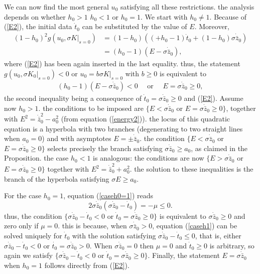 \begin{Proof}
We can now find the most general $u_0$ satisfying all these
restrictions. the analysis depends on whether $ h_0>1$ $ h_0 <1$ 
or $ h_0=1$. We start with $ h_0 \neq  1$.
Because of (\ref{E2}),
the initial data $\dot{t}_0$  can be substituted by the value of $E$.
Moreover,
\begin{align*}
(1 -  h_0)^2 g(u_0, \sigma K|_{s=0}) &= (1-  h_0 ) \left ( ( +  h_0-1  ) \dot{t}_0
+ (1-   h_0) \sigma  \dot{{\bar z}}_0 \right ) \\
&= \left ( h_0 -1 \right ) \left ( E - \sigma \dot{{\bar z}}_0 \right ),
\end{align*}
where (\ref{E2})
has been again inserted in the last equality. 
thus, the statement $g(u_0, \sigma K_0|_{s=0}) < 0$  or 
$u_0 = b \sigma K|_{s=0}$ with $b \geq 0$ is equivalent to
\begin{gather*}
(h_0 -1 ) (E -  \sigma \dot{{\bar z}}_0 ) < 0 \quad \mbox{ or } \quad 
 E = \sigma  \dot{{\bar z}}_0 \geq  0,
\end{gather*}
the second inequality being a consequence of $\dot{t}_0 =  \sigma \dot{{\bar z}}_0 \geq 0$ and (\ref{E2}). Assume now $ h_0 >1$. the conditions to be imposed are 
$\{ E <  \sigma \dot{{\bar z}}_0$ or $E =  \sigma \dot{{\bar z}}_0  \geq 0\}$,
together with $E^2 = \dot{{\bar z}}_0^2 - a_0^2$ 
(from equation (\ref{energy2})). the locus of this quadratic equation is a hyperbola 
with two branches (degenerating to two straight lines when $a_0=0$)
and with asymptotes $E = \pm \dot{{\bar z}}_0$. the condition
$\{ E <  \sigma \dot{{\bar z}}_0$ or $E =  \sigma \dot{{\bar z}}_0 \geq 0\} $ selects
precisely the branch satisfying 
$ \sigma \dot{{\bar z}}_0 \geq  a_0$, as claimed in the Proposition.
the case $ h_0 <1$ is analogous:  the conditions are now
$\{ E >  \sigma \dot{{\bar z}}_0$ or $E =  \sigma \dot{{\bar z}}_0 \geq 0\}$ together
with
$E^2 = \dot{{\bar z}}_0^2 + a_0^2$. the solution to these inequalities
is the branch of the hyperbola satisfying 
$\sigma E \geq a_0$.

For the case $ h_0=1$, equation (\ref{caseh0=1}) reads
\begin{equation}
2 \sigma \dot{{\bar z}}_0 \left( \sigma \dot{{\bar z}}_0 -  \dot{t}_0
\right) = -  \mu  \leq 0.
\label{caseh1}
\end{equation}
thus, the condition
$\{ \sigma \dot{{\bar z}}_0 -  \dot{t}_0 < 0$ or $\dot{t}_0 =  \sigma \dot{{\bar z}}_0 \geq  0\}$
is equivalent to $ \sigma \dot{{\bar z}}_0 \geq 0$ and zero only if
$\mu = 0$. this is because, when $ \sigma \dot{{\bar z}}_0 >0$,  
equation (\ref{caseh1}) can be solved uniquely for $\dot{t}_0$ 
with the solution satisfying $\sigma \dot{{\bar z}}_0 -  \dot{t}_0 \leq 0$,
that is, either $\sigma \dot{{\bar z}}_0 -  \dot{t}_0 < 0$ or 
$\dot{t_0} =  \sigma \dot{{\bar z}}_0 > 0$.
When $\sigma  \dot{{\bar z}}_0 =0$ then $\mu=0$ and
$ \dot{t}_0 \geq 0$ is arbitrary, so again
we satisfy  $\{ \sigma \dot{{\bar z}}_0 -  \dot{t}_0 <0$ 
or $\dot{t}_0 =  \sigma \dot{{\bar z}}_0 \geq 0\} $. 
Finally, the statement $E=  \sigma \dot{{\bar z}}_0$ when $h_0=1$ 
follows directly from (\ref{E2}).
\end{Proof}

